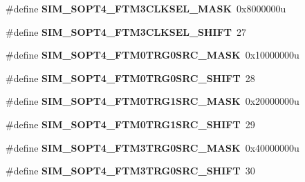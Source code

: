 \begin{DoxyCompactItemize}
\item 
\#define {\bfseries S\+I\+M\+\_\+\+S\+O\+P\+T4\+\_\+\+F\+T\+M3\+C\+L\+K\+S\+E\+L\+\_\+\+M\+A\+SK}~0x8000000u\hypertarget{group__SIM__Register__Masks_gad4d365b5afa43ac25661ec0d06423162}{}\label{group__SIM__Register__Masks_gad4d365b5afa43ac25661ec0d06423162}

\item 
\#define {\bfseries S\+I\+M\+\_\+\+S\+O\+P\+T4\+\_\+\+F\+T\+M3\+C\+L\+K\+S\+E\+L\+\_\+\+S\+H\+I\+FT}~27\hypertarget{group__SIM__Register__Masks_ga54a0762662b5e94c962af29aa373c893}{}\label{group__SIM__Register__Masks_ga54a0762662b5e94c962af29aa373c893}

\item 
\#define {\bfseries S\+I\+M\+\_\+\+S\+O\+P\+T4\+\_\+\+F\+T\+M0\+T\+R\+G0\+S\+R\+C\+\_\+\+M\+A\+SK}~0x10000000u\hypertarget{group__SIM__Register__Masks_ga14159dfb09e3ad4c1b9f2f4950a3f4a6}{}\label{group__SIM__Register__Masks_ga14159dfb09e3ad4c1b9f2f4950a3f4a6}

\item 
\#define {\bfseries S\+I\+M\+\_\+\+S\+O\+P\+T4\+\_\+\+F\+T\+M0\+T\+R\+G0\+S\+R\+C\+\_\+\+S\+H\+I\+FT}~28\hypertarget{group__SIM__Register__Masks_ga76c7302a8f939758f0b68fb05ea6dd08}{}\label{group__SIM__Register__Masks_ga76c7302a8f939758f0b68fb05ea6dd08}

\item 
\#define {\bfseries S\+I\+M\+\_\+\+S\+O\+P\+T4\+\_\+\+F\+T\+M0\+T\+R\+G1\+S\+R\+C\+\_\+\+M\+A\+SK}~0x20000000u\hypertarget{group__SIM__Register__Masks_ga427b99978dda3f6bf1c0a97559315276}{}\label{group__SIM__Register__Masks_ga427b99978dda3f6bf1c0a97559315276}

\item 
\#define {\bfseries S\+I\+M\+\_\+\+S\+O\+P\+T4\+\_\+\+F\+T\+M0\+T\+R\+G1\+S\+R\+C\+\_\+\+S\+H\+I\+FT}~29\hypertarget{group__SIM__Register__Masks_gacf67b2d7908669c38dfb06eff3c7fa8a}{}\label{group__SIM__Register__Masks_gacf67b2d7908669c38dfb06eff3c7fa8a}

\item 
\#define {\bfseries S\+I\+M\+\_\+\+S\+O\+P\+T4\+\_\+\+F\+T\+M3\+T\+R\+G0\+S\+R\+C\+\_\+\+M\+A\+SK}~0x40000000u\hypertarget{group__SIM__Register__Masks_gabc6374f1f0ccc17a93f55a32e6eb9c89}{}\label{group__SIM__Register__Masks_gabc6374f1f0ccc17a93f55a32e6eb9c89}

\item 
\#define {\bfseries S\+I\+M\+\_\+\+S\+O\+P\+T4\+\_\+\+F\+T\+M3\+T\+R\+G0\+S\+R\+C\+\_\+\+S\+H\+I\+FT}~30\hypertarget{group__SIM__Register__Masks_gaddc879ce1fd5df4ad46528983ad4480e}{}\label{group__SIM__Register__Masks_gaddc879ce1fd5df4ad46528983ad4480e}


\end{DoxyCompactItemize}
